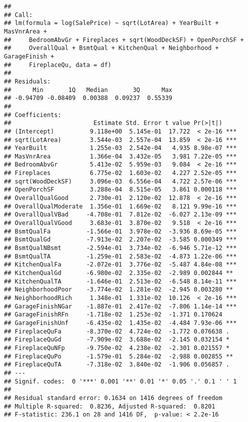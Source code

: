 \documentclass[
]{article}
\begin{document}
\begin{verbatim}
## 
## Call:
## lm(formula = log(SalePrice) ~ sqrt(LotArea) + YearBuilt + MasVnrArea + 
##     BedroomAbvGr + Fireplaces + sqrt(WoodDeckSF) + OpenPorchSF + 
##     OverallQual + BsmtQual + KitchenQual + Neighborhood + GarageFinish + 
##     FireplaceQu, data = df)
## 
## Residuals:
##      Min       1Q   Median       3Q      Max 
## -0.94709 -0.08409  0.00388  0.09237  0.55339 
## 
## Coefficients:
##                       Estimate Std. Error t value Pr(>|t|)    
## (Intercept)          9.118e+00  5.145e-01  17.722  < 2e-16 ***
## sqrt(LotArea)        3.544e-03  2.557e-04  13.859  < 2e-16 ***
## YearBuilt            1.255e-03  2.542e-04   4.935 8.98e-07 ***
## MasVnrArea           1.366e-04  3.432e-05   3.981 7.22e-05 ***
## BedroomAbvGr         5.413e-02  5.959e-03   9.084  < 2e-16 ***
## Fireplaces           6.775e-02  1.603e-02   4.227 2.52e-05 ***
## sqrt(WoodDeckSF)     3.096e-03  6.556e-04   4.722 2.57e-06 ***
## OpenPorchSF          3.288e-04  8.515e-05   3.861 0.000118 ***
## OverallQualGood      2.730e-01  2.120e-02  12.878  < 2e-16 ***
## OverallQualModerate  1.356e-01  1.669e-02   8.121 9.99e-16 ***
## OverallQualVBad     -4.708e-01  7.812e-02  -6.027 2.13e-09 ***
## OverallQualVGood     3.683e-01  3.870e-02   9.518  < 2e-16 ***
## BsmtQualFa          -1.566e-01  3.978e-02  -3.936 8.69e-05 ***
## BsmtQualGd          -7.913e-02  2.207e-02  -3.585 0.000349 ***
## BsmtQualNBsmt       -2.594e-01  3.734e-02  -6.946 5.71e-12 ***
## BsmtQualTA          -1.259e-01  2.583e-02  -4.873 1.22e-06 ***
## KitchenQualFa       -2.072e-01  3.776e-02  -5.487 4.84e-08 ***
## KitchenQualGd       -6.980e-02  2.335e-02  -2.989 0.002844 ** 
## KitchenQualTA       -1.646e-01  2.513e-02  -6.548 8.14e-11 ***
## NeighborhoodPoor    -3.774e-02  1.281e-02  -2.945 0.003280 ** 
## NeighborhoodRich     1.348e-01  1.331e-02  10.126  < 2e-16 ***
## GarageFinishNGar    -1.887e-01  2.417e-02  -7.806 1.14e-14 ***
## GarageFinishRFn     -1.718e-02  1.253e-02  -1.371 0.170624    
## GarageFinishUnf     -6.435e-02  1.435e-02  -4.484 7.93e-06 ***
## FireplaceQuFa       -8.370e-02  4.724e-02  -1.772 0.076638 .  
## FireplaceQuGd       -7.909e-02  3.688e-02  -2.145 0.032154 *  
## FireplaceQuNFp      -9.750e-02  4.238e-02  -2.301 0.021557 *  
## FireplaceQuPo       -1.579e-01  5.284e-02  -2.988 0.002855 ** 
## FireplaceQuTA       -7.318e-02  3.840e-02  -1.906 0.056857 .  
## ---
## Signif. codes:  0 '***' 0.001 '**' 0.01 '*' 0.05 '.' 0.1 ' ' 1
## 
## Residual standard error: 0.1634 on 1416 degrees of freedom
## Multiple R-squared:  0.8236, Adjusted R-squared:  0.8201 
## F-statistic: 236.1 on 28 and 1416 DF,  p-value: < 2.2e-16
\end{verbatim}
\end{document}
